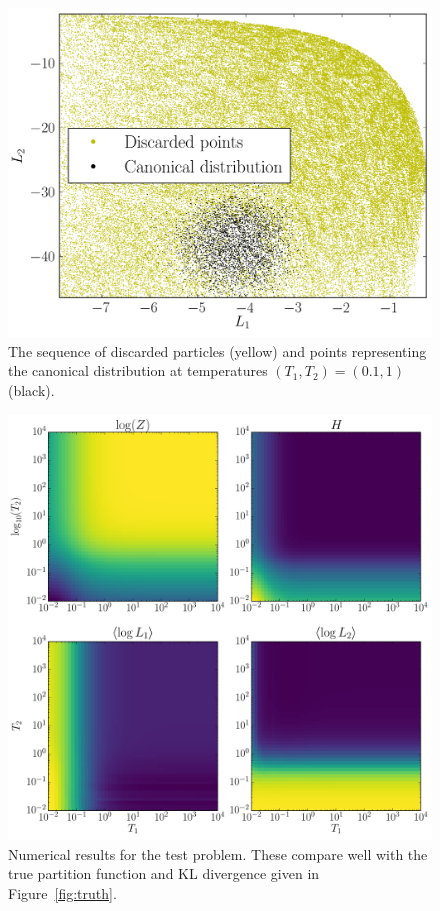 \documentclass[journal,article,accept,moreauthors,pdftex,12pt,a4paper]{mdpi}
\begin{document}
\begin{figure}
\centering
\includegraphics[scale=0.75]{figures/output.png}
\caption{The sequence of discarded particles (yellow) and
points representing the canonical distribution at temperatures
$(T_1, T_2) = (0.1, 1)$ (black).\label{fig:output}}
\end{figure}



\begin{figure}
\centering
\includegraphics[scale=0.5]{figures/results.pdf}
\caption{Numerical results for the test problem. These compare well with the
true partition function and KL divergence given in Figure~\ref{fig:truth}.
\label{fig:results}}
\end{figure}
\end{document}
